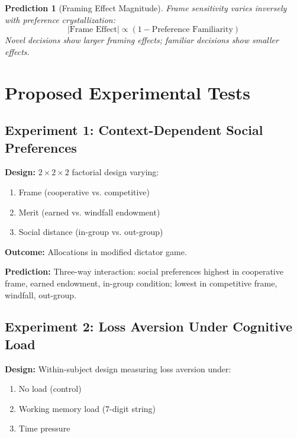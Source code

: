 \documentclass[12pt]{article}
\newtheorem{prediction}{Prediction}
\begin{document}
\begin{prediction}[Framing Effect Magnitude]
Frame sensitivity varies inversely with preference crystallization:
\begin{equation}
|\text{Frame Effect}| \propto (1 - \text{Preference Familiarity})
\end{equation}
Novel decisions show larger framing effects; familiar decisions show smaller effects.
\end{prediction}



\section{Proposed Experimental Tests}
\label{sec:experiments}

\subsection{Experiment 1: Context-Dependent Social Preferences}

\textbf{Design:} $2 \times 2 \times 2$ factorial design varying:
\begin{enumerate}
    \item Frame (cooperative vs. competitive)
    \item Merit (earned vs. windfall endowment)
    \item Social distance (in-group vs. out-group)
\end{enumerate}

\textbf{Outcome:} Allocations in modified dictator game.

\textbf{Prediction:} Three-way interaction: social preferences highest in cooperative frame, earned endowment, in-group condition; lowest in competitive frame, windfall, out-group.

\subsection{Experiment 2: Loss Aversion Under Cognitive Load}

\textbf{Design:} Within-subject design measuring loss aversion under:
\begin{enumerate}
    \item No load (control)
    \item Working memory load (7-digit string)
    \item Time pressure
\end{enumerate}
\end{document}
